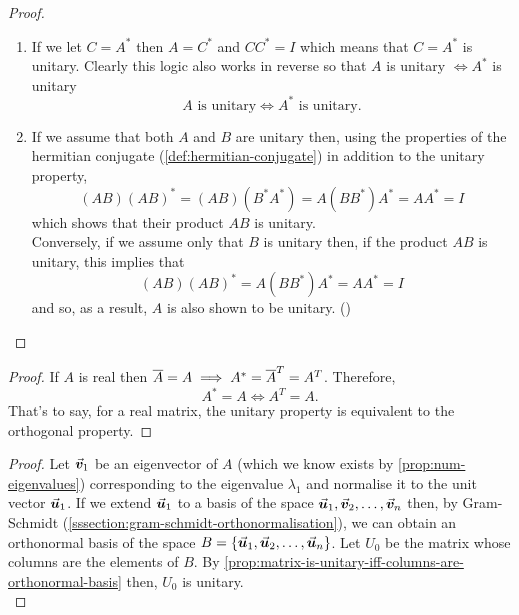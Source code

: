 \documentclass[../MathsNotesBase.tex]{subfiles}
\begin{document}
{		\medskip
		\begin{proof}\nl
			\begin{enumerate}[label=(\roman*)]
				\item{If we let ${ C = A^* }$ then ${ A = C^* }$ and ${ C C^* = I }$ which means that ${ C = A^* }$ is unitary. Clearly this logic also works in reverse so that $A$ is unitary $\iff A^*$ is unitary
					\[ A \text{ is unitary} \iff A^* \text{ is unitary}. \]
				}
				\item{If we assume that both $A$ and $B$ are unitary then, using the properties of the hermitian conjugate (\ref{def:hermitian-conjugate}) in addition to the unitary property,
					\[ (AB)(AB)^* = (AB)(B^*A^*) = A(BB^*)A^* = AA^* = I \]
					which shows that their product $AB$ is unitary.\\
					Conversely, if we assume only that $B$ is unitary then, if the product $AB$ is unitary, this implies that
					\[ (AB)(AB)^* = A(BB^*)A^* = AA^* = I \]
					and so, as a result, $A$ is also shown to be unitary. ()
				}
			\end{enumerate}
		\end{proof}
	
		\bigskip
		\begin{proof}
			If $A$ is real then ${ \overline{A} = A \implies A^* = \overline{A}^T = A^T }$. Therefore,
			\[ A^* = A \iff A^T = A. \]
			That's to say, for a real matrix, the unitary property is equivalent to the orthogonal property.
		\end{proof}
	
		\bigskip
		\begin{proof}
			Let $\vec{\bm{v}}_1$ be an eigenvector of $A$ (which we know exists by \autoref{prop:num-eigenvalues}) corresponding to the eigenvalue $\lambda_1$ and normalise it to the unit vector $\vec{\bm{u}}_1$. If we extend $\vec{\bm{u}}_1$ to a basis of the space ${ \vec{\bm{u}}_1,\vec{\bm{v}}_2,\dots,\vec{\bm{v}}_n }$ then, by Gram-Schmidt (\ref{sssection:gram-schmidt-orthonormalisation}), we can obtain an orthonormal basis of the space ${ B = \{ \vec{\bm{u}}_1,\vec{\bm{u}}_2,\dots,\vec{\bm{u}}_n \} }$. Let $U_0$ be the matrix whose columns are the elements of $B$. By \autoref{prop:matrix-is-unitary-iff-columns-are-orthonormal-basis} then, $U_0$ is unitary.\\
			

\end{proof}}
\end{document}
